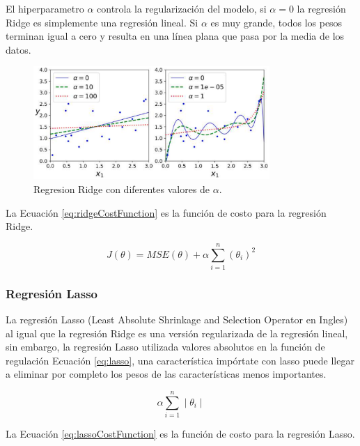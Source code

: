 El hiperparametro $\alpha$ controla la regularización del modelo, si $\alpha = 0$ la regresión Ridge es simplemente una regresión lineal. Si $\alpha$ es muy grande, todos los pesos terminan igual a cero y resulta en una línea plana que pasa por la media de los datos.

\begin{figure}[H]
    \centering
    \includegraphics[width=0.8\textwidth]{MarcoTeorico/imgs/Ridge.png}
    \caption{Regresion Ridge con diferentes valores de $\alpha$.}
    \label{fig:regresionRidge}
\end{figure}

La Ecuación \ref{eq:ridgeCostFunction} es la función de costo para la regresión Ridge.

\begin{equation}
    \label{eq:ridgeCostFunction}
    J(\theta) = MSE(\theta)
    + \alpha \displaystyle\sum\limits_{i=1}^n (\theta_i)^{2}
\end{equation}

\subsubsection{Regresión Lasso}

La regresión Lasso (Least Absolute Shrinkage and Selection Operator en Ingles) al igual que la regresión Ridge es una versión regularizada de la regresión lineal, sin embargo, la regresión Lasso utilizada valores absolutos en la función de regulación Ecuación \ref{eq:lasso}, una característica impórtate con lasso puede llegar a eliminar por completo los pesos de las características menos importantes.

\begin{equation}
    \label{eq:lasso}
    \alpha \displaystyle\sum\limits_{i=1}^n  \mid \theta_i \mid
\end{equation}

La Ecuación \ref{eq:lassoCostFunction} es la función de costo para la regresión Lasso.


